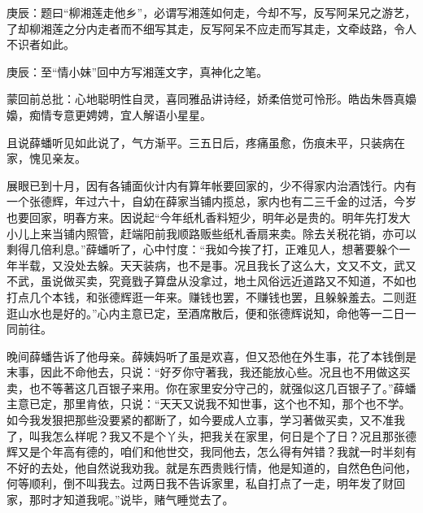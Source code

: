 \begin{parag}
    \begin{note}庚辰：题曰“柳湘莲走他乡”，必谓写湘莲如何走，今却不写，反写阿呆兄之游艺，了却柳湘莲之分内走者而不细写其走，反写阿呆不应走而写其走，文牵歧路，令人不识者如此。\end{note}
\end{parag}


\begin{parag}
    \begin{note}庚辰：至“情小妹”回中方写湘莲文字，真神化之笔。\end{note}
\end{parag}


\begin{parag}
    \begin{note}蒙回前总批：心地聪明性自灵，喜同雅品讲诗经，娇柔倍觉可怜形。皓齿朱唇真嬝嬝，痴情专意更娉娉，宜人解语小星星。\end{note}
\end{parag}


\begin{parag}
    且说薛蟠听见如此说了，气方渐平。三五日后，疼痛虽愈，伤痕未平，只装病在家，愧见亲友。
\end{parag}


\begin{parag}
    展眼已到十月，因有各铺面伙计内有算年帐要回家的，少不得家内治酒饯行。内有一个张德辉，年过六十，自幼在薛家当铺内揽总，家内也有二三千金的过活，今岁也要回家，明春方来。因说起“今年纸札香料短少，明年必是贵的。明年先打发大小儿上来当铺内照管，赶端阳前我顺路贩些纸札香扇来卖。除去关税花销，亦可以剩得几倍利息。”薛蟠听了，心中忖度：“我如今挨了打，正难见人，想著要躲个一年半载，又没处去躲。天天装病，也不是事。况且我长了这么大，文又不文，武又不武，虽说做买卖，究竟戥子算盘从没拿过，地土风俗远近道路又不知道，不如也打点几个本钱，和张德辉逛一年来。赚钱也罢，不赚钱也罢，且躲躲羞去。二则逛逛山水也是好的。”心内主意已定，至酒席散后，便和张德辉说知，命他等一二日一同前往。
\end{parag}


\begin{parag}
    晚间薛蟠告诉了他母亲。薛姨妈听了虽是欢喜，但又恐他在外生事，花了本钱倒是末事，因此不命他去，只说：“好歹你守著我，我还能放心些。况且也不用做这买卖，也不等著这几百银子来用。你在家里安分守己的，就强似这几百银子了。”薛蟠主意已定，那里肯依，只说：“天天又说我不知世事，这个也不知，那个也不学。如今我发狠把那些没要紧的都断了，如今要成人立事，学习著做买卖，又不准我了，叫我怎么样呢？我又不是个丫头，把我关在家里，何日是个了日？况且那张德辉又是个年高有德的，咱们和他世交，我同他去，怎么得有舛错？我就一时半刻有不好的去处，他自然说我劝我。就是东西贵贱行情，他是知道的，自然色色问他，何等顺利，倒不叫我去。过两日我不告诉家里，私自打点了一走，明年发了财回家，那时才知道我呢。”说毕，赌气睡觉去了。
\end{parag}


